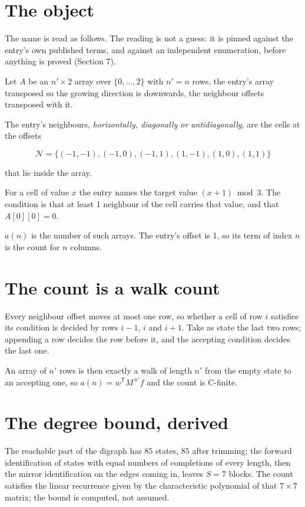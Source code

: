 \documentclass[11pt]{article}
\theoremstyle{definition}
\begin{document}
\section{The object}

The name is read as follows. The reading is not a guess: it is pinned against the entry's own published terms, and against an independent enumeration, before anything is proved (Section 7).

Let $A$ be an $n' \times 2$ array over $\{0,\dots,2\}$ with $n' = n$ rows, the entry's array transposed so the growing direction is downwards, the neighbour offsets transposed with it.

The entry's neighbours, {\itshape horizontally, diagonally or antidiagonally}, are the cells at the offsets

\[\mathcal{N} = \{(-1,-1), (-1,0), (-1,1), (1,-1), (1,0), (1,1)\}\]

that lie inside the array.

For a cell of value $x$ the entry names the target value $(x + 1) \bmod 3$. The condition is that at least 1 neighbour of the cell carries that value, and that $A[0][0] = 0$.

$a(n)$ is the number of such arrays. The entry's offset is 1, so its term of index $n$ is the count for $n$ columns.

\section{The count is a walk count}

Every neighbour offset moves at most one row, so whether a cell of row $i$ satisfies its condition is decided by rows $i-1$, $i$ and $i+1$. Take as state the last two rows; appending a row decides the row before it, and the accepting condition decides the last one.

An array of $n'$ rows is then exactly a walk of length $n'$ from the empty state to an accepting one, so $a(n) = w^{\mathsf T}M^{\,n'}f$ and the count is C-finite.

\section{The degree bound, derived}

The reachable part of the digraph has $85$ states, $85$ after trimming; the forward identification of states with equal numbers of completions of every length, then the mirror identification on the edges coming in, leaves $S = 7$ blocks. The count satisfies the linear recurrence given by the characteristic polynomial of that $7\times7$ matrix; the bound is computed, not assumed.
\end{document}

